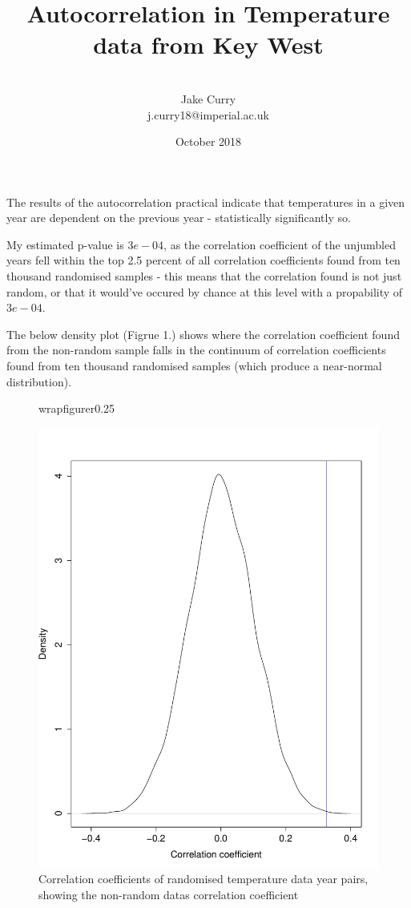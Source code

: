 \documentclass[12pt, letterpaper]{article}
\title{Autocorrelation in Temperature data from Key West}
\author{\\Jake Curry\\j.curry18@imperial.ac.uk}
\date{October 2018}
\begin{document}
The results of the autocorrelation practical indicate that temperatures in a given year are dependent on the previous year - statistically significantly so. 

My estimated p-value is $3e-04$, as the correlation coefficient of the unjumbled years fell within the top 2.5 percent of all correlation coefficients found from ten thousand randomised samples - this means that the correlation found is not just random, or that it would've occured by chance at this level with a propability of $3e-04$. 

The below density plot (Figrue 1.) shows where the correlation coefficient found from the non-random sample falls in the continuum of correlation coefficients found from ten thousand randomised samples (which produce a near-normal distribution). 

\begin{figure}[h]
	{wrapfigure}{r}{0.25\textwidth}
\caption{Correlation coefficients of randomised temperature data year pairs, showing the non-random datas correlation coefficient}
\centering
\includegraphics[width=12cm]{AutoCorrPlot}
\end{figure}
\end{document}
